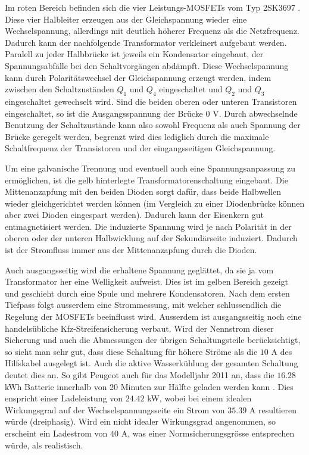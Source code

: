Im roten Bereich befinden sich die vier Leistungs-MOSFETs vom Typ 2SK3697 \cite{2sk3697}. Diese vier Halbleiter erzeugen aus der Gleichspannung wieder eine Wechselspannung, allerdings mit deutlich höherer Frequenz als die Netzfrequenz. Dadurch kann der nachfolgende Transformator verkleinert aufgebaut werden. Paralell zu jeder Halbbrücke ist jeweils ein Kondensator eingebaut, der Spannungsabfälle bei den Schaltvorgängen abdämpft. Diese Wechselspannung kann durch Polaritätswechsel der Gleichspannung erzeugt werden, indem zwischen den Schaltzuständen $Q_1$ und $Q_4$ eingeschaltet und $Q_2$ und $Q_3$ eingeschaltet gewechselt wird. Sind die beiden oberen oder unteren Transistoren eingeschaltet, so ist die Ausgangsspannung der Brücke $0$ V. Durch abwechselnde Benutzung der Schaltzustände kann also sowohl Frequenz als auch Spannung der Brücke geregelt werden, begrenzt wird dies lediglich durch die maximale Schaltfrequenz der Transistoren und der eingangsseitigen Gleichspannung.

Um eine galvanische Trennung und eventuell auch eine Spannungsanpassung zu ermöglichen, ist die gelb hinterlegte Transformatorenschaltung eingebaut. Die Mittenanzapfung mit den beiden Dioden sorgt dafür, dass beide Halbwellen wieder gleichgerichtet werden können (im Vergleich zu einer Diodenbrücke können aber zwei Dioden eingespart werden). Dadurch kann der Eisenkern gut entmagnetisiert werden. Die induzierte Spannung wird je nach Polarität in der oberen oder der unteren Halbwicklung auf der Sekundärseite induziert. Dadurch ist der Stromfluss immer aus der Mittenanzapfung durch die Dioden.

Auch ausgangsseitig wird die erhaltene Spannung geglättet, da sie ja vom Transformator her eine Welligkeit aufweist. Dies ist im gelben Bereich gezeigt und geschieht durch eine Spule und mehrere Kondensatoren. Nach dem ersten Tiefpass folgt ausserdem eine Strommessung, mit welcher schlussendlich die Regelung der MOSFETs beeinflusst wird. Ausserdem ist ausgangsseitig noch eine handelsübliche Kfz-Streifensicherung verbaut. Wird der Nennstrom dieser Sicherung und auch die Abmessungen der übrigen Schaltungsteile berücksichtigt, so sieht man sehr gut, dass diese Schaltung für höhere Ströme als die $10$ A des Hilfskabel ausgelegt ist. Auch die aktive Wasserkühlung der gesamten Schaltung deutet dies an. So gibt Peugeot auch für das Modelljahr 2011 an, dass die $16.28$ kWh Batterie innerhalb von 20 Minuten zur Hälfte geladen werden kann \cite{ion}. Dies enspricht einer Ladeleistung von $24.42$ kW, wobei bei einem idealen Wirkungsgrad auf der Wechselspannungsseite ein Strom von $35.39$ A resultieren würde (dreiphasig). Wird ein nicht idealer Wirkungsgrad angenommen, so erscheint ein Ladestrom von $40$ A, was einer Normsicherungsgrösse entsprechen würde, als realistisch.

